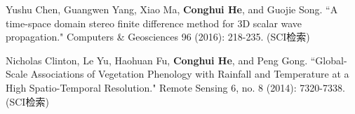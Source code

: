 \begin{resume}
\begin{publications}
    \item Yushu Chen, Guangwen Yang, Xiao Ma, \textbf{Conghui He}, and Guojie Song. ``A time-space domain stereo finite difference method for 3D scalar wave propagation." Computers \& Geosciences 96 (2016): 218-235. (SCI检索)

    \item Nicholas Clinton, Le Yu, Haohuan Fu, \textbf{Conghui He}, and Peng Gong. ``Global-Scale Associations of Vegetation Phenology with Rainfall and Temperature at a High Spatio-Temporal Resolution." Remote Sensing 6, no. 8 (2014): 7320-7338. (SCI检索)
  \end{publications}


\end{resume}
